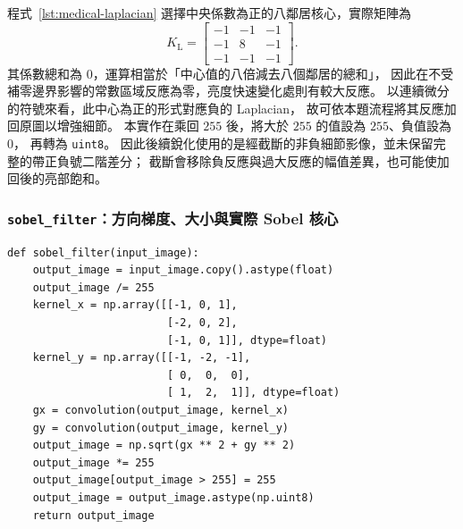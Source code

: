 程式~\ref{lst:medical-laplacian} 選擇中央係數為正的八鄰居核心，實際矩陣為
\begin{equation}
  K_{\mathrm{L}}=
  \begin{bmatrix}
    -1&-1&-1\\
    -1& 8&-1\\
    -1&-1&-1
  \end{bmatrix}.
  \label{eq:medical-laplacian-kernel}
\end{equation}
其係數總和為 $0$，運算相當於「中心值的八倍減去八個鄰居的總和」，
因此在不受補零邊界影響的常數區域反應為零，亮度快速變化處則有較大反應。
以連續微分的符號來看，此中心為正的形式對應負的 Laplacian，
故可依本題流程將其反應加回原圖以增強細節。
本實作在乘回 $255$ 後，將大於 $255$ 的值設為 $255$、負值設為 $0$，
再轉為 \texttt{uint8}。
因此後續銳化使用的是經截斷的非負細節影像，並未保留完整的帶正負號二階差分；
截斷會移除負反應與過大反應的幅值差異，也可能使加回後的亮部飽和。

\subsubsection{\textnormal{\texttt{sobel\_filter}}：方向梯度、大小與實際 Sobel 核心}

\noindent\begin{minipage}{\linewidth}
\begin{lstlisting}[caption={以兩個 Sobel 核心計算梯度大小},label={lst:medical-sobel}]
def sobel_filter(input_image):
    output_image = input_image.copy().astype(float)
    output_image /= 255
    kernel_x = np.array([[-1, 0, 1],
                         [-2, 0, 2],
                         [-1, 0, 1]], dtype=float)
    kernel_y = np.array([[-1, -2, -1],
                         [ 0,  0,  0],
                         [ 1,  2,  1]], dtype=float)
    gx = convolution(output_image, kernel_x)
    gy = convolution(output_image, kernel_y)
    output_image = np.sqrt(gx ** 2 + gy ** 2)
    output_image *= 255
    output_image[output_image > 255] = 255
    output_image = output_image.astype(np.uint8)
    return output_image
\end{lstlisting}
\end{minipage}\par

